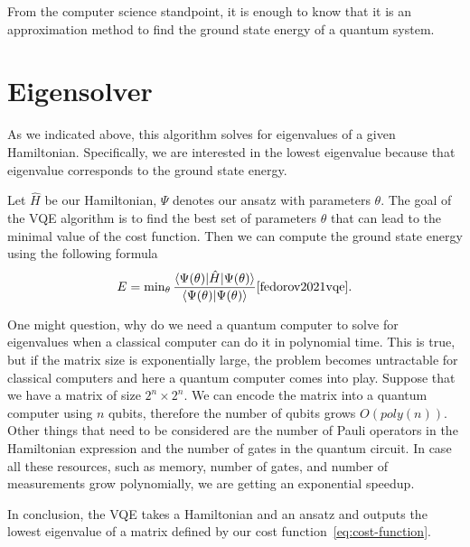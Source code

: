 From the computer science standpoint, it is enough to know that it is an approximation method to find the ground state energy of a quantum system.

\section{Eigensolver}
As we indicated above, this algorithm solves for eigenvalues of a given Hamiltonian. Specifically, we are interested in the lowest eigenvalue because that eigenvalue corresponds to the ground state energy. 

Let $\hat{H}$ be our Hamiltonian, $\Psi$ denotes our ansatz with parameters $\theta$. The goal of the VQE algorithm is to find the best set of parameters $\theta$ that can lead to the minimal value of the cost function. Then we can compute the ground state energy using the following formula 
\begin{equation} \label{eq:cost-function}
E = \min\nolimits_{\theta} \frac{\langle\Psi(\theta)\rvert\hat{H}\lvert\Psi(\theta)\rangle}{\langle\Psi(\theta)\vert\Psi(\theta)\rangle}\cite{fedorov2021vqe} \text{.}
\end{equation}


One might question, why do we need a quantum computer to solve for eigenvalues when a classical computer can do it in polynomial time. This is true, but if the matrix size is exponentially large, the problem becomes untractable for classical computers and here a quantum computer comes into play. Suppose that we have a matrix of size $2^n \times 2^n$. We can encode the matrix into a quantum computer using $n$ qubits, therefore the number of qubits grows $O(poly(n))$. Other things that need to be considered are the number of Pauli operators in the Hamiltonian expression and the number of gates in the quantum circuit. In case all these resources, such as memory, number of gates, and number of measurements grow polynomially, we are getting an exponential speedup.

In conclusion, the VQE takes a Hamiltonian and an ansatz and outputs the lowest eigenvalue of a matrix defined by our cost function~\ref{eq:cost-function}.

